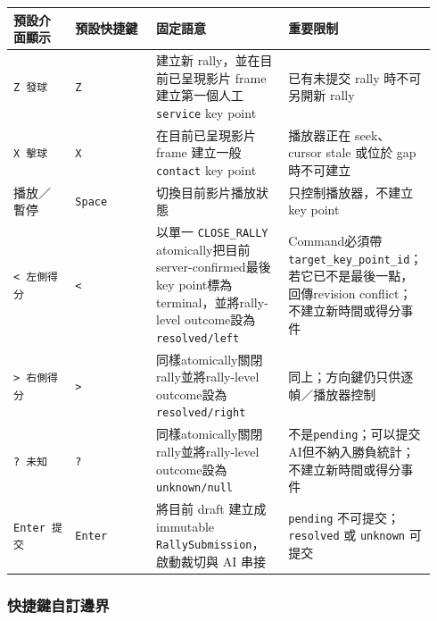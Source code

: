 \documentclass[
  9pt,
  a4paper,
]{article}
\begin{document}
\begin{longtable}[]{@{}>{\RaggedRight\arraybackslash}p{0.11\linewidth}>{\RaggedRight\arraybackslash}p{0.19\linewidth}>{\RaggedRight\arraybackslash}p{0.31\linewidth}>{\RaggedRight\arraybackslash}p{0.33\linewidth}@{}}
\toprule\noalign{}
預設介面顯示 & 預設快捷鍵 & 固定語意 & 重要限制 \\
\midrule\noalign{}
\endhead
\bottomrule\noalign{}
\endlastfoot
\texttt{Z\ 發球} & \texttt{Z} & 建立新 rally，並在目前已呈現影片 frame
建立第一個人工 \texttt{service} key point & 已有未提交 rally
時不可另開新 rally \\
\texttt{X\ 擊球} & \texttt{X} & 在目前已呈現影片 frame 建立一般
\texttt{contact} key point & 播放器正在 seek、cursor stale 或位於 gap
時不可建立 \\
播放／暫停 & \texttt{Space} & 切換目前影片播放狀態 & 只控制播放器，不建立 key point \\
\texttt{\textless{}\ 左側得分} & \texttt{\textless{}} &
以單一 \texttt{CLOSE\_\allowbreak{}RALLY} atomically把目前server-confirmed最後key
point標為terminal，並將rally-level outcome設為\texttt{resolved/left} &
Command必須帶\texttt{target\_\allowbreak{}key\_\allowbreak{}point\_\allowbreak{}id}；若它已不是最後一點，回傳revision conflict；不建立新時間或得分事件 \\
\texttt{\textgreater{}\ 右側得分} & \texttt{\textgreater{}} &
同樣atomically關閉rally並將rally-level outcome設為\texttt{resolved/right} &
同上；方向鍵仍只供逐幀／播放器控制 \\
\texttt{?\ 未知} & \texttt{?} &
同樣atomically關閉rally並將rally-level outcome設為\texttt{unknown/null} &
不是\texttt{pending}；可以提交AI但不納入勝負統計；不建立新時間或得分事件 \\
\texttt{Enter\ 提交} & \texttt{Enter} & 將目前 draft 建立成 immutable
\texttt{RallySubmission}，啟動裁切與 AI 串接 & \texttt{pending}
不可提交；\texttt{resolved} 或 \texttt{unknown} 可提交 \\
\end{longtable}

\subsubsection{快捷鍵自訂邊界}
\end{document}
